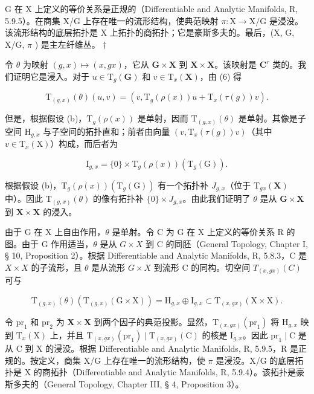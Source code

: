 G 在 X 上定义的等价关系是正规的（Differentiable and Analytic Manifolds, R, 5.9.5）。在商集 X/G 上存在唯一的流形结构，使典范映射 \(\pi: \mathrm{X} \to \mathrm{X} / \mathrm{G}\) 是浸没。该流形结构的底层拓扑是 X 上拓扑的商拓扑；它是豪斯多夫的。最后，(X, G, X/G, \(\pi\) ) 是主左纤维丛。 \(\dagger\)

令 \(\theta\) 为映射 \((g, x) \mapsto (x, gx)\)，它从 \(\mathbf{G} \times \mathbf{X}\) 到 \(\mathbf{X} \times \mathbf{X}\)。该映射是 \(\mathbf{C}^r\) 类的。我们证明它是浸入。对于 \(u \in \mathrm{T}_g(\mathbf{G})\) 和 \(v \in \mathrm{T}_x(\mathbf{X})\)，由 (6) 得

\[
\mathrm{T} _ {(g, x)} (\theta) (u, v) = (v, \mathrm{T} _ {g} (\rho (x)) u + \mathrm{T} _ {x} (\tau (g)) v).\tag{7}
\]

但是，根据假设 (b)，\(\mathrm{T}_{g}(\rho(x))\) 是单射，因而 \(\mathrm{T}_{(g,x)}(\theta)\) 是单射。其像是子空间 \(\mathrm{H}_{g,x}\) 与子空间的拓扑直和；前者由向量 \((v,\mathrm{T}_x(\tau(g))v)\)（其中 \(v\in \mathrm{T}_x(\mathrm{X})\)）构成，而后者为

\[
\mathrm{I} _ {g, x} = \{0 \} \times \mathrm{T} _ {g} (\rho (x)) (\mathrm{T} _ {g} (\mathrm{G})).
\]

根据假设 (b)，\(\mathrm{T}_g(\rho(x))(\mathrm{T}_g(\mathrm{G}))\) 有一个拓扑补 \(J_{g,x}\)（位于 \(\mathrm{T}_{gx}(\mathbf{X})\) 中）。因此 \(\mathrm{T}_{(g,x)}(\theta)\) 的像有拓扑补 \(\{0\} \times J_{g,x}\)。由此我们证明了 \(\theta\) 是从 \(\mathbf{G} \times \mathbf{X}\) 到 \(\mathbf{X} \times \mathbf{X}\) 的浸入。

由于 G 在 X 上自由作用，\(\theta\) 是单射。令 C 为 G 在 X 上定义的等价关系 R 的图。由于 G 作用适当，\(\theta\) 是从 \(G \times X\) 到 C 的同胚（General Topology, Chapter I, § 10, Proposition 2）。根据 Differentiable and Analytic Manifolds, R, 5.8.3，C 是 \(X \times X\) 的子流形，且 \(\theta\) 是从流形 \(G \times X\) 到流形 C 的同构。切空间 \(T_{(x,gx)}(C)\) 可与

\[
\mathrm{T} _ {(g, x)} (\theta) \left(\mathrm{T} _ {(g, x)} (\mathrm{G} \times \mathrm{X})\right) = \mathrm{H} _ {g, x} \oplus \mathrm{I} _ {g, x} \subset \mathrm{T} _ {(x, g x)} (\mathrm{X} \times \mathrm{X}).
\]

令 \(\mathrm{pr}_1\) 和 \(\mathrm{pr}_2\) 为 \(\mathbf{X} \times \mathbf{X}\) 到两个因子的典范投影。显然，\(\mathrm{T}_{(x,gx)}(\mathrm{pr}_1)\) 将 \(\mathrm{H}_{g,x}\) 映到 \(\mathrm{T}_x(\mathrm{X})\) 上，并且 \(\mathrm{T}_{(x,gx)}(\mathrm{pr}_1) \mid \mathrm{T}_{(x,gx)}(\mathrm{C})\) 的核是 \(\mathrm{I}_{g,x}\)。因此 \(\mathrm{pr}_1 \mid \mathrm{C}\) 是从 \(\mathrm{C}\) 到 \(\mathrm{X}\) 的浸没。根据 Differentiable and Analytic Manifolds, R, 5.9.5，R 是正规的。按定义，商集 X/G 上存在唯一的流形结构，使 \(\pi\) 是浸没。X/G 的底层拓扑是 X 的商拓扑（Differentiable and Analytic Manifolds, R, 5.9.4）。该拓扑是豪斯多夫的（General Topology, Chapter III, § 4, Proposition 3）。

